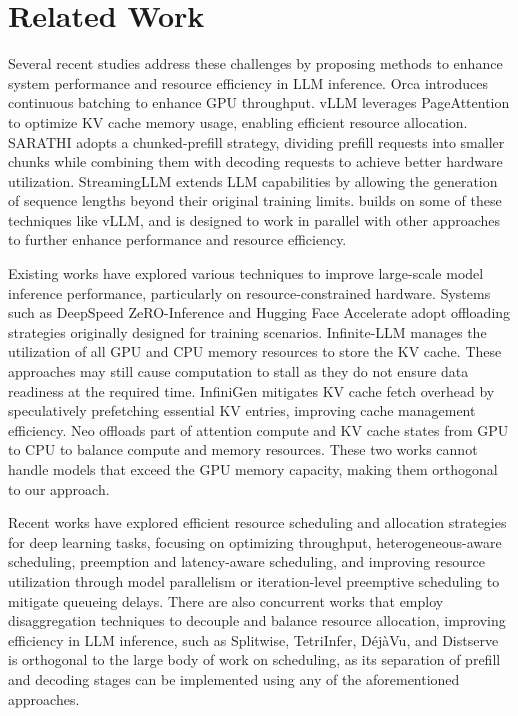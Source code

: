 \section{Related Work}
\label{sec:relwk}

Several recent studies address these challenges by proposing methods to enhance system performance and resource efficiency in LLM inference. 
Orca\cite{orca} introduces continuous batching to enhance GPU throughput. 
vLLM\cite{vllm} leverages PageAttention to optimize KV cache memory usage, enabling efficient resource allocation. 
SARATHI\cite{SARATHI} adopts a chunked-prefill strategy, dividing prefill requests into smaller chunks while combining them with decoding requests to achieve better hardware utilization. 
StreamingLLM\cite{StreamingLLM} extends LLM capabilities by allowing the generation of sequence lengths beyond their original training limits. 
\sys builds on some of these techniques like vLLM, and is designed to work in parallel with other approaches to further enhance performance and resource efficiency.

Existing works have explored various techniques to improve large-scale model inference performance, particularly on resource-constrained hardware. 
Systems such as DeepSpeed ZeRO-Inference\cite{zero-infer} and Hugging Face Accelerate\cite{huggingface} adopt offloading strategies originally designed for training scenarios. 
Infinite-LLM\cite{lin2024infinitellmefficientllmservice} manages the utilization of all GPU and CPU memory resources to store the KV cache.
These approaches may still cause computation to stall as they do not ensure data readiness at the required time.
InfiniGen\cite{infinigen} mitigates KV cache fetch overhead by speculatively prefetching essential KV entries, improving cache management efficiency. 
Neo\cite{jiangxuanlin} offloads part of attention compute and KV cache states from GPU to CPU to balance compute and memory resources.
These two works cannot handle models that exceed the GPU memory capacity, making them orthogonal to our approach.

Recent works have explored efficient resource scheduling and allocation strategies for deep learning tasks, focusing on optimizing throughput\cite{pollux}, 
heterogeneous-aware scheduling\cite{sia}, preemption and latency-aware scheduling\cite{Clockwork, SHEPHERD}, 
and improving resource utilization through model parallelism\cite{AlpaServe} or iteration-level preemptive scheduling to mitigate queueing delays\cite{fastserve}.
There are also concurrent works that employ disaggregation techniques to decouple and balance resource allocation, 
improving efficiency in LLM inference, such as Splitwise\cite{splitwise}, TetriInfer\cite{TetriInfer}, DéjàVu\cite{dejavu}, and Distserve\cite{distserve}
\sys is orthogonal to the large body of work on scheduling, as its separation of prefill and decoding stages can be implemented using any of the aforementioned approaches.


